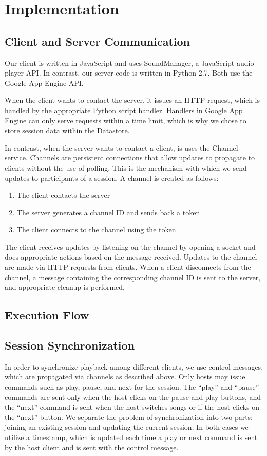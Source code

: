 \section{Implementation}
\label{sec:implementation}

\subsection{Client and Server Communication}
Our client is written in JavaScript and uses SoundManager, a
JavaScript audio player API. In contrast, our server code is
written in Python 2.7. Both use the Google App Engine API. 

When the client wants to contact the server, it issues an HTTP
request, which is handled by the appropriate Python script handler.
Handlers in Google App Engine can only serve requests within a
time limit, which is why we chose to store session data within
the Datastore.

In contrast, when the server wants to contact a client, is uses 
the Channel service. Channels are persistent connections that 
allow updates to propagate to clients without the use of polling.
This is the mechanism with which we send updates to participants
of a session. A channel is created as follows: 
\begin{enumerate}
  \item The client contacts the server
  \item The server generates a channel ID and sends back a token
  \item The client connects to the channel using the token
\end{enumerate}
The client receives updates by listening on the channel by opening
a socket and does appropriate actions based on the message received.
Updates to the channel are made via HTTP requests from clients. When
a client disconnects from the channel, a message containing the 
corresponding channel ID is sent to the server, and appropriate
cleanup is performed.	

\subsection{Execution Flow}

\subsection{Session Synchronization}
In order to synchronize playback among different clients, we use 
control messages, which are propagated via channels as described
above. Only hosts may issue commands such as play, pause, and 
next for the session. The ``play'' and ``pause'' commands are sent
only when the host clicks on the pause and play buttons, and the 
``next'' command is sent when the host switches songs or if the
host clicks on the ``next'' button. We separate the problem of synchronization 
into two parts: joining an existing session and updating the
current session. In both cases we utilize a timestamp, which is 
updated each time a play or next command is sent by the host client
and is sent with the control message. 

